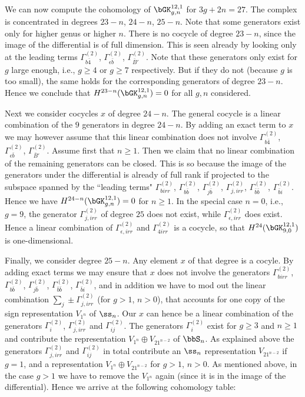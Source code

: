 We can now compute the cohomology of $\myB_{g,n}$ for $3g+2n=27$. The complex is concentrated in degrees $23-n$, $24-n$, $25-n$. Note that some generators exist only for higher genus or higher $n$. There is no cocycle of degree $23-n$, since the image of the differential is of full dimension. This is seen already by looking only at the leading terms $\Gamma_{b\bar 4}^{(2)}$, $\Gamma_{\epsilon \bar b}^{(2)}$, $\Gamma_{\bar B'}^{(2)}$.
Note that these generators only exist for $g$ large enough, i.e., $g\geq 4$ or $g\geq 7$ respectively. But if they do not (because $g$ is too small), the same holds for the corresponding generators of degree $23-n$.
Hence we conclude that $H^{23-n}(\myB_{g,n})=0$ for all $g,n$ considered.

Next we consider cocycles $x$ of degree $24-n$.
The general cocycle is a linear combination of the $9$ generators in degree $24-n$. By adding an exact term to $x$ we may however assume that this linear combination does not involve $\Gamma_{b\bar 4}^{(2)}$, $\Gamma_{\epsilon \bar b}^{(2)}$, $\Gamma_{\bar B'}^{(2)}$.
Assume first that $n\geq 1$. Then we claim that no linear combination of the remaining generators can be closed. This is so because the image of the generators under the differential is already of full rank if projected to the subspace spanned by the ``leading terms" $\Gamma_{birr}^{(2)}$, $\Gamma_{b\bar b}^{(2)}$,
$\Gamma_{j\bar b}^{(2)}$,
$\Gamma_{j,irr}^{(2)}$,
$\Gamma_{\bar b\bar b}^{(2)}$,
$\Gamma_{\bar bi}^{(2)}$.
Hence we have $H^{24-n}(\myB_{g,n})=0$ for $n\geq 1$.
In the special case $n=0$, i.e., $g=9$, the generator $\Gamma_{j,irr}^{(2)}$ of degree $25$ does not exist, while $\Gamma_{\epsilon,irr}^{(2)}$ does exist.
Hence a linear combination of $\Gamma_{\epsilon,irr}^{(2)}$ and $\Gamma_{4irr}^{(2)}$ is a cocycle, so that $H^{24}(\myB_{9,0})$ is one-dimensional.

Finally, we consider degree $25-n$. 
Any element $x$ of that degree is a cocyle. 
By adding exact terms we may ensure that $x$ does not involve the generators 
$\Gamma_{birr}^{(2)}$,
$\Gamma_{b\bar b}^{(2)}$,
$\Gamma_{j\bar b}^{(2)}$,
$\Gamma_{\bar b\bar b}^{(2)}$,
$\Gamma_{\bar bi}^{(2)}$,
and in addition we have to mod out the linear combination $\sum_j\pm \Gamma_{j,irr}^{(2)}$ (for $g>1$, $n>0$), that accounts for one copy of the sign representation $V_{1^n}$ of $\ss_n$.
Our $x$ can hence be a linear combination of the generators $\Gamma_i^{(2)}$,
$\Gamma_{j,irr}^{(2)}$ and $\Gamma_{ij}^{(2)}$.
The generators $\Gamma_i^{(2)}$ exist for $g\geq 3$ and $n\geq 1$ and contribute the representation $V_{1^n} \oplus V_{21^{n-2}}$ of $\bbS_n$.
As explained above the generators $\Gamma_{j,irr}^{(2)}$ and $\Gamma_{ij}^{(2)}$ in total contribute an $\ss_n$ representation $V_{21^{n-2}}$ if $g=1$, and a representation $V_{1^n}\oplus V_{21^{n-2}}$ for $g>1$, $n>0$. As mentioned above, in the case $g>1$ we have to remove the $V_{1^n}$ again (since it is in the image of the differential).
Hence we arrive at the following cohomology table:

